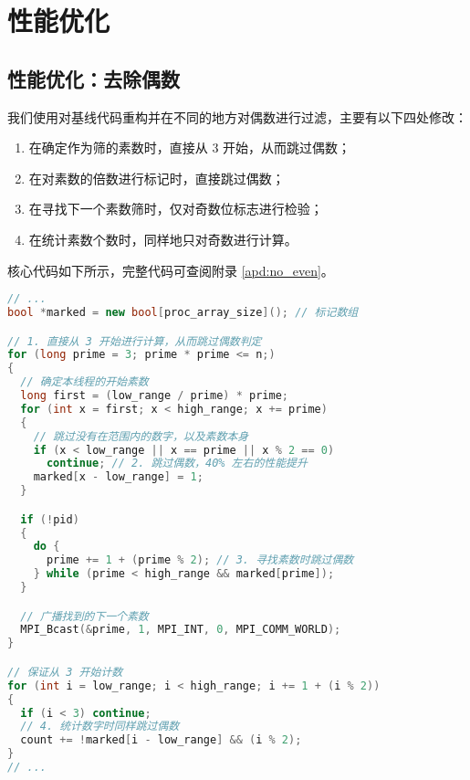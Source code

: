 \documentclass[11pt]{article}
\begin{document}
  \section{性能优化}
  \subsection{性能优化：去除偶数}
  我们使用对基线代码重构并在不同的地方对偶数进行过滤，主要有以下四处修改：
  \begin{enumerate}[itemindent=1em]
    \item 在确定作为筛的素数时，直接从 3 开始，从而跳过偶数；
    \item 在对素数的倍数进行标记时，直接跳过偶数；
    \item 在寻找下一个素数筛时，仅对奇数位标志进行检验；
    \item 在统计素数个数时，同样地只对奇数进行计算。
  \end{enumerate}

  核心代码如下所示，完整代码可查阅附录 \ref{apd:no_even}。

  \begin{file}
    \begin{lstlisting}[language=C++]
// ...
bool *marked = new bool[proc_array_size](); // 标记数组

// 1. 直接从 3 开始进行计算，从而跳过偶数判定
for (long prime = 3; prime * prime <= n;)
{
  // 确定本线程的开始素数
  long first = (low_range / prime) * prime;
  for (int x = first; x < high_range; x += prime)
  {
    // 跳过没有在范围内的数字，以及素数本身
    if (x < low_range || x == prime || x % 2 == 0)
      continue; // 2. 跳过偶数，40% 左右的性能提升
    marked[x - low_range] = 1;
  }

  if (!pid)
  {
    do {
      prime += 1 + (prime % 2); // 3. 寻找素数时跳过偶数
    } while (prime < high_range && marked[prime]);
  }

  // 广播找到的下一个素数
  MPI_Bcast(&prime, 1, MPI_INT, 0, MPI_COMM_WORLD);
}

// 保证从 3 开始计数
for (int i = low_range; i < high_range; i += 1 + (i % 2))
{
  if (i < 3) continue;
  // 4. 统计数字时同样跳过偶数
  count += !marked[i - low_range] && (i % 2);
}
// ...
    \end{lstlisting}
  \end{file}
\end{document}
